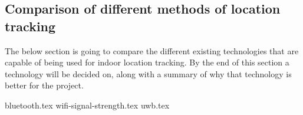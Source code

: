 \subsection{Comparison of different methods of location tracking}
The below section is going to compare the different existing technologies that are capable of being used for indoor location tracking. By the end of this section a technology will be decided on, along with a summary of why that technology is better for the project.

{bluetooth.tex}
{wifi-signal-strength.tex}
{uwb.tex}
